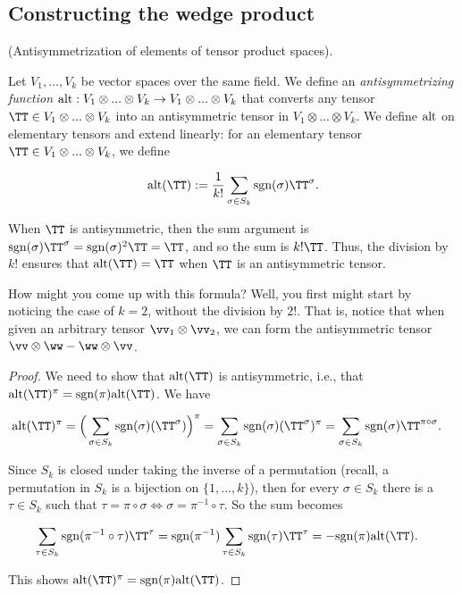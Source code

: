 \subsection*{Constructing the wedge product}

\begin{defn}
    (Antisymmetrization of elements of tensor product spaces).
    
    Let $V_1, ..., V_k$ be vector spaces over the same field. We define an \textit{antisymmetrizing function} ${\text{alt}:V_1 \otimes ... \otimes V_k \rightarrow V_1 \otimes ... \otimes V_k}$ that converts any tensor $\TT \in V_1 \otimes ... \otimes V_k$ into an antisymmetric tensor in $V_1 \otimes ... \otimes V_k$. We define $\text{alt}$ on elementary tensors and extend linearly: for an elementary tensor $\TT \in V_1 \otimes ... \otimes V_k$, we define
    
    \begin{align*}
        \alt(\TT) := \frac{1}{k!} \sum_{\sigma \in S_k} \sgn(\sigma) \TT^\sigma.
    \end{align*}
    
    When $\TT$ is antisymmetric, then the sum argument is $\sgn(\sigma) \TT^\sigma = \sgn(\sigma)^2 \TT = \TT$, and so the sum is $k! \TT$. Thus, the division by $k!$ ensures that $\alt(\TT) = \TT$ when $\TT$ is an antisymmetric tensor.
    
    How might you come up with this formula? Well, you first might start by noticing the case of $k = 2$, without the division by $2!$. That is, notice that when given an arbitrary tensor $\vv_1 \otimes \vv_2$, we can form the antisymmetric tensor $\vv \otimes \ww - \ww \otimes \vv$.
\end{defn}

\begin{proof}
    We need to show that $\alt(\TT)$ is antisymmetric, i.e., that $\alt(\TT)^\pi = \sgn(\pi) \alt(\TT)$. We have
            
    \begin{align*}
        \alt(\TT)^\pi &= \Big(\sum_{\sigma \in S_k} \sgn(\sigma) (\TT^\sigma)\Big)^\pi = \sum_{\sigma \in S_k} \sgn(\sigma) (\TT^\sigma)^\pi = \sum_{\sigma \in S_k} \sgn(\sigma) \TT^{\pi \circ \sigma}.
    \end{align*}
            
    Since $S_k$ is closed under taking the inverse of a permutation (recall, a permutation in $S_k$ is a bijection on $\{1, ..., k\}$), then for every $\sigma \in S_k$ there is a $\tau \in S_k$ such that $\tau = \pi \circ \sigma \iff \sigma = \pi^{-1} \circ \tau$. So the sum becomes
            
    \begin{align*}
        \sum_{\tau \in S_k} \sgn(\pi^{-1} \circ \tau) \TT^\tau &= \sgn(\pi^{-1}) \sum_{\tau \in S_k} \sgn(\tau) \TT^\tau = -\sgn(\pi) \alt(\TT).
    \end{align*}
    
    This shows $\alt(\TT)^\pi = \sgn(\pi) \alt(\TT)$.
\end{proof}

